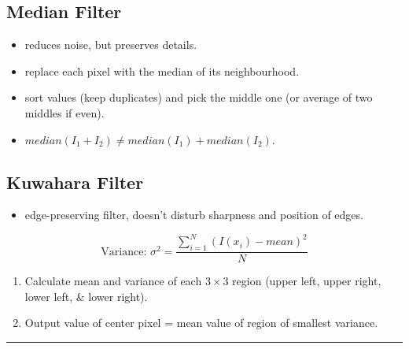 \subsection{Median Filter}
\begin{itemize}
  \item reduces noise, but preserves details.
  \item replace each pixel with the median of its neighbourhood.
  \item sort values {\color{red} (keep duplicates)} and pick the middle one (or average of two middles if even).
  \item $median(I_1+I_2)\neq median(I_1)+median(I_2)$.
\end{itemize}
\subsection{Kuwahara Filter}
\begin{itemize}
  \item edge-preserving filter, doesn't disturb sharpness and position of edges.
\end{itemize}
\[
    \text{Variance: }\sigma^2 = \frac{\sum_{i=1}^{N}{(I(x_i) - mean)^2}}{N}
\]
\begin{enumerate}
  \item Calculate mean and variance of each $3 \times 3$ region (upper left, upper right, lower left, \& lower right).
  \item Output value of center pixel = mean value of region of smallest variance.
\end{enumerate}
\hrule
